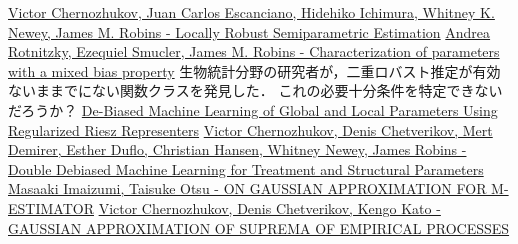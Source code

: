 \documentclass[uplatex,dvipdfmx]{jsreport}
\begin{document}
\begin{thebibliography}{99}
    \href{https://arxiv.org/abs/1608.00033}{Victor Chernozhukov, Juan Carlos Escanciano, Hidehiko Ichimura, Whitney K. Newey, James M. Robins - Locally Robust Semiparametric Estimation}
    \href{https://arxiv.org/abs/1904.03725}{Andrea Rotnitzky, Ezequiel Smucler, James M. Robins - Characterization of parameters with a mixed bias property}
    生物統計分野の研究者が，二重ロバスト推定が有効ないままでにない関数クラスを発見した．
    これの必要十分条件を特定できないだろうか？
    \href{https://arxiv.org/abs/1802.08667}{De-Biased Machine Learning of Global and Local Parameters Using Regularized Riesz Representers}
    \href{https://arxiv.org/abs/1608.00060}{Victor Chernozhukov, Denis Chetverikov, Mert Demirer, Esther Duflo, Christian Hansen, Whitney Newey, James Robins - Double Debiased Machine Learning for Treatment and Structural Parameters}
    \href{https://arxiv.org/abs/2012.15678}{Masaaki Imaizumi, Taisuke Otsu - ON GAUSSIAN APPROXIMATION FOR M-ESTIMATOR}
    \href{https://arxiv.org/abs/1212.6885}{Victor Chernozhukov, Denis Chetverikov, Kengo Kato - GAUSSIAN APPROXIMATION OF SUPREMA OF EMPIRICAL PROCESSES}
\end{thebibliography}
\end{document}
